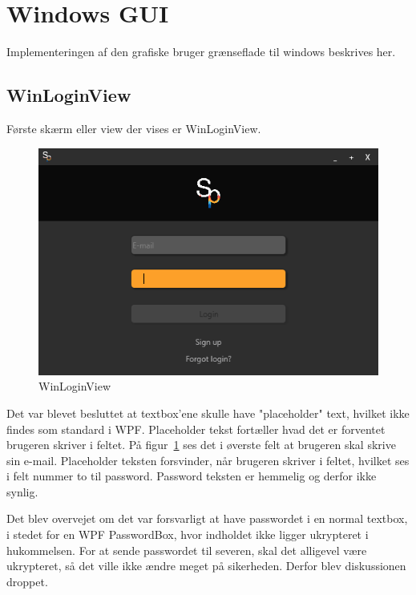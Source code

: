 \section{Windows GUI}
Implementeringen af den grafiske bruger grænseflade til windows beskrives her.
\subsection{WinLoginView}
Første skærm eller view der vises er WinLoginView.
\begin{figure}
	\centering
	\includegraphics[width=0.7\linewidth]{figs/implementering/winloginview}
	\caption{WinLoginView}
	\label{fig:winloginview}
\end{figure}
Det var blevet besluttet at textbox'ene skulle have "placeholder" text, hvilket ikke findes som standard i WPF. Placeholder tekst fortæller hvad det er forventet brugeren skriver i feltet. På figur~\ref{fig:winloginview} ses det i øverste felt at brugeren skal skrive sin e-mail. Placeholder teksten forsvinder, når brugeren skriver i feltet, hvilket ses i felt nummer to til password. Password teksten er hemmelig og derfor ikke synlig. 

Det blev overvejet om det var forsvarligt at have passwordet i en normal textbox, i stedet for en WPF PasswordBox, hvor indholdet ikke ligger ukrypteret i hukommelsen. 
For at sende passwordet til severen, skal det alligevel være ukrypteret, så det ville ikke ændre meget på sikerheden. Derfor blev diskussionen droppet.

